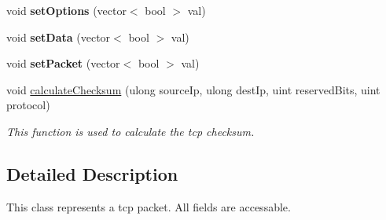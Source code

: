 \begin{DoxyCompactItemize}
\item 
\hypertarget{classwhisper__library_1_1TcpPacket_a095139a0c4ec593afa12991e8eb33ee0}{void {\bfseries set\-Options} (vector$<$ bool $>$ val)}\label{classwhisper__library_1_1TcpPacket_a095139a0c4ec593afa12991e8eb33ee0}

\item 
\hypertarget{classwhisper__library_1_1TcpPacket_a969d01e24f894a7f2b99dee210bb6a65}{void {\bfseries set\-Data} (vector$<$ bool $>$ val)}\label{classwhisper__library_1_1TcpPacket_a969d01e24f894a7f2b99dee210bb6a65}

\item 
\hypertarget{classwhisper__library_1_1TcpPacket_a0b0a67dddb600b642b0499c4714981ea}{void {\bfseries set\-Packet} (vector$<$ bool $>$ val)}\label{classwhisper__library_1_1TcpPacket_a0b0a67dddb600b642b0499c4714981ea}

\item 
void \hyperlink{classwhisper__library_1_1TcpPacket_a3461c1b760853c1e6c5e859f9a642a6d}{calculate\-Checksum} (ulong source\-Ip, ulong dest\-Ip, uint reserved\-Bits, uint protocol)
\begin{DoxyCompactList}\small\item\em \-This function is used to calculate the tcp checksum. \end{DoxyCompactList}\end{DoxyCompactItemize}


\subsection{\-Detailed \-Description}
\-This class represents a tcp packet. \-All fields are accessable. 

